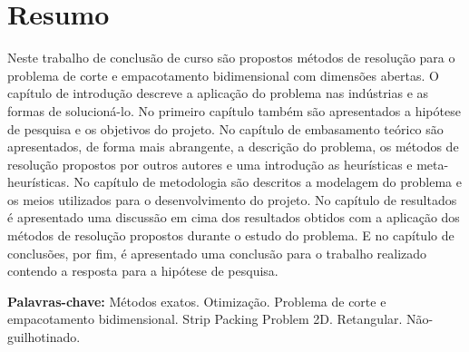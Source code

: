 \section*{Resumo}

    Neste trabalho de conclusão de curso são propostos métodos de resolução para o problema de corte e empacotamento bidimensional com dimensões abertas. O capítulo de introdução descreve a aplicação do problema nas indústrias e as formas de solucioná-lo. No primeiro capítulo também são apresentados a hipótese de pesquisa e os objetivos do projeto. No capítulo de embasamento teórico são apresentados, de forma mais abrangente, a descrição do problema, os métodos de resolução propostos por outros autores e uma introdução as heurísticas e meta-heurísticas. No capítulo de metodologia são descritos a modelagem do problema e os meios utilizados para o desenvolvimento do projeto. No capítulo de resultados é apresentado uma discussão em cima dos resultados obtidos com a aplicação dos métodos de resolução propostos durante o estudo do problema. E no capítulo de conclusões, por fim, é apresentado uma conclusão para o trabalho realizado contendo a resposta para a hipótese de pesquisa.
    
    {\bf Palavras-chave:} Métodos exatos. Otimização. Problema de corte e empacotamento bidimensional. Strip Packing Problem 2D. Retangular. Não-guilhotinado.